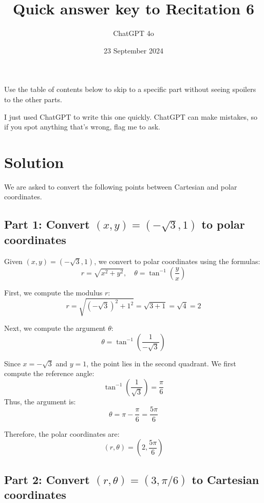 \documentclass[11pt]{article}
\begin{document}
\title{Quick answer key to Recitation 6}
\author{ChatGPT 4o}
\date{23 September 2024}
\maketitle

Use the table of contents below to skip to a specific part
without seeing spoilers to the other parts.

I just used ChatGPT to write this one quickly.
ChatGPT can make mistakes, so if you spot anything that's wrong, flag me to ask.

\tableofcontents



\newpage

\section{Solution}

We are asked to convert the following points between Cartesian and polar coordinates.

\subsection{Part 1: Convert $(x, y) = (-\sqrt{3}, 1)$ to polar coordinates}

Given \( (x, y) = (-\sqrt{3}, 1) \), we convert to polar coordinates using the formulas:
\[
r = \sqrt{x^2 + y^2}, \quad \theta = \tan^{-1}\left( \frac{y}{x} \right)
\]

First, we compute the modulus \( r \):
\[
r = \sqrt{(-\sqrt{3})^2 + 1^2} = \sqrt{3 + 1} = \sqrt{4} = 2
\]

Next, we compute the argument \( \theta \):
\[
\theta = \tan^{-1}\left( \frac{1}{-\sqrt{3}} \right)
\]

Since \( x = -\sqrt{3} \) and \( y = 1 \), the point lies in the second quadrant. We first compute the reference angle:
\[
\tan^{-1}\left( \frac{1}{\sqrt{3}} \right) = \frac{\pi}{6}
\]
Thus, the argument is:
\[
\theta = \pi - \frac{\pi}{6} = \frac{5\pi}{6}
\]

Therefore, the polar coordinates are:
\[
(r, \theta) = (2, \frac{5\pi}{6})
\]

\newpage

\subsection{Part 2: Convert \( (r, \theta) = (3, \pi/6) \) to Cartesian coordinates}
\end{document}
